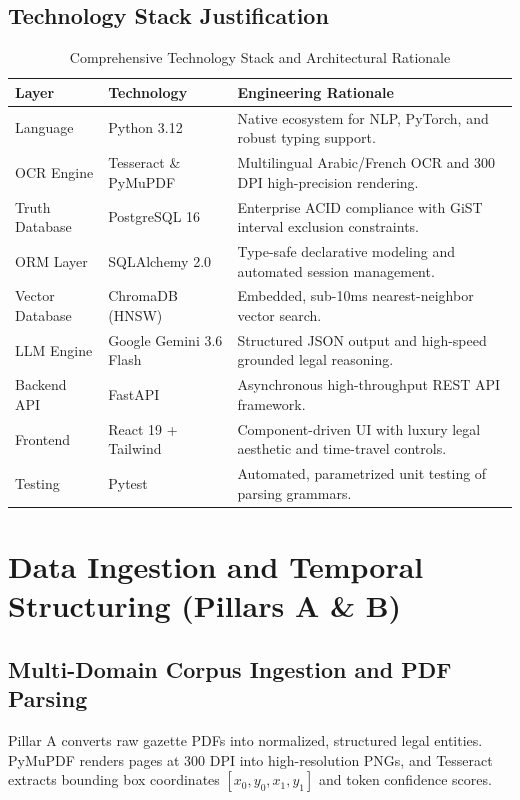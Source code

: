 \documentclass[12pt,a4paper]{report}
\begin{document}
\section{Technology Stack Justification}
\begin{table}[H]
\centering
\small
\caption{Comprehensive Technology Stack and Architectural Rationale}
\label{tab:tech_stack}
\begin{tabularx}{\textwidth}{l l X}
\toprule
\textbf{Layer} & \textbf{Technology} & \textbf{Engineering Rationale} \\
\midrule
Language & Python 3.12 & Native ecosystem for NLP, PyTorch, and robust typing support. \\
OCR Engine & Tesseract \& PyMuPDF & Multilingual Arabic/French OCR and 300 DPI high-precision rendering. \\
Truth Database & PostgreSQL 16 & Enterprise ACID compliance with GiST interval exclusion constraints. \\
ORM Layer & SQLAlchemy 2.0 & Type-safe declarative modeling and automated session management. \\
Vector Database & ChromaDB (HNSW) & Embedded, sub-10ms nearest-neighbor vector search. \\
LLM Engine & Google Gemini 3.6 Flash & Structured JSON output and high-speed grounded legal reasoning. \\
Backend API & FastAPI & Asynchronous high-throughput REST API framework. \\
Frontend & React 19 + Tailwind & Component-driven UI with luxury legal aesthetic and time-travel controls. \\
Testing & Pytest & Automated, parametrized unit testing of parsing grammars. \\
\bottomrule
\end{tabularx}
\end{table}

\chapter{Data Ingestion and Temporal Structuring (Pillars A \& B)}

\section{Multi-Domain Corpus Ingestion and PDF Parsing}
Pillar A converts raw gazette PDFs into normalized, structured legal entities. PyMuPDF renders pages at 300 DPI into high-resolution PNGs, and Tesseract extracts bounding box coordinates $[x_0, y_0, x_1, y_1]$ and token confidence scores.
\end{document}
